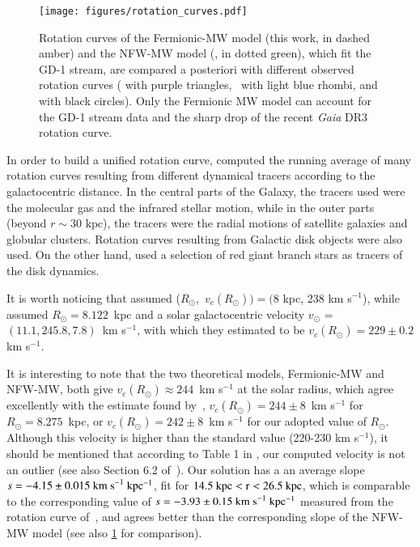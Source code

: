 \documentclass[twocolumn]{aa}
\begin{document}
\begin{figure}
   \centering
   \texttt{[image: figures/rotation\_curves.pdf]}
   \caption{Rotation curves of the Fermionic-MW model (this work, in dashed amber) and the NFW-MW model (\cite{2019MNRAS.486.2995M}, in dotted green), which fit the GD-1 stream, are compared a posteriori with different observed rotation curves (\citealp{Eilers_2019} with purple triangles,~\citealp{sofue_2020} with light blue rhombi, and \citealp{Jiao2023} with black circles). Only the Fermionic MW model can account for the GD-1 stream data and the sharp drop of the recent {\it Gaia} DR3 rotation curve.}
   \label{fig:rotcurve}
\end{figure}


In order to build a unified rotation curve, \citet{sofue_2020} computed the running average of many rotation curves resulting from different dynamical tracers according to the galactocentric distance. In the central parts of the Galaxy, the tracers used were the molecular gas and the infrared stellar motion, while in the outer parts (beyond $r\sim30 \textrm{~kpc}$), the tracers were the radial motions of satellite galaxies and globular clusters. Rotation curves resulting from Galactic disk objects were also used.
On the other hand, \citet{Eilers_2019} used a selection of red giant branch stars as tracers of the disk dynamics.

It is worth noticing  that \citet{sofue_2020} assumed
($R_\odot$,~$v_c(R_\odot))=(8$ kpc, 238 km s$^{-1}$), while \citet{Eilers_2019}
assumed $R_\odot=8.122$~kpc and a solar galactocentric velocity $v_\odot$ = $(11.1, 245.8, 7.8)$~km s$^{-1}$,
with which they estimated to be $v_c(R_\odot)=229\pm0.2$ km s$^{-1}$.

It is interesting to note that the two theoretical models, Fermionic-MW and NFW-MW, both give $v_\mathrm{c}(R_\odot)\approx 244$~km s$^{-1}$ at the solar radius, which agree excellently with the estimate found
by~\citet{2020arXiv201202169B}, $v_c(R_\odot)=244\pm 8$~km s$^{-1}$ for $R_\odot = 8.275$~kpc, or $v_c(R_\odot)=242\pm 8$~km s$^{-1}$ for our adopted value of $R_\odot$. Although this velocity is higher than the standard value (220-230 km s$^{-1}$), it should be mentioned
that according to Table 1 in \citet{sofue_2020}, our computed velocity is not an outlier (see also Section 6.2 of~\citealt{Honma_2012}).
Our solution has a an average slope $s=-4.15\pm0.015~\rm{km~s}^{-1}~kpc^{-1}$, fit for $14.5~\rm{kpc} < r < 26.5~\rm{kpc}$, which is
comparable to the corresponding value of $s=-3.93\pm0.15~\rm{km~s}^{-1}~kpc^{-1}$ measured from the rotation curve of~\citet{Jiao2023}, and agrees better than the corresponding slope of the NFW-MW model (see also \cref{fig:rotcurve} for comparison).
\end{document}
